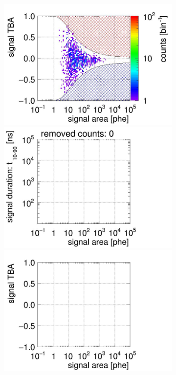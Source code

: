 \begin{landscape}
\begin{figure}[!p]
\begin{subfigure}[t]{0.32\textwidth}
	\includegraphics[width=\figurewidth,clip,trim={0 98 0 40}]{Figures/GasTest/CutsValid/res64767/tbapa16Vecfig64767.jpg}
	\includegraphics[width=\figurewidth,clip,trim={0 98 0 15}]{Figures/GasTest/CutsValid/res64767/pdpaX16Vecfig64767.jpg}
	\includegraphics[width=\figurewidth,clip,trim={0 8 0 40}]{Figures/GasTest/CutsValid/res64767/tbapaX16Vecfig64767.jpg}

\end{subfigure}
\end{figure}
\end{landscape}
